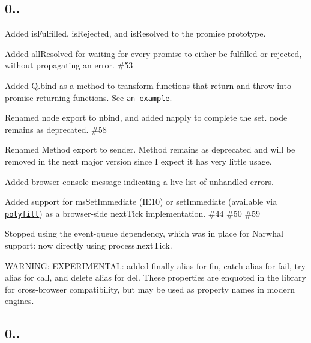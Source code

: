 \subsection*{0..}


\begin{DoxyItemize}
\item Added {\ttfamily is\+Fulfilled}, {\ttfamily is\+Rejected}, and {\ttfamily is\+Resolved} to the promise prototype.
\item Added {\ttfamily all\+Resolved} for waiting for every promise to either be fulfilled or rejected, without propagating an error.  \#53
\item Added {\ttfamily Q.\+bind} as a method to transform functions that return and throw into promise-\/returning functions. See \href{https://gist.github.com/1782808}{\tt an example}. 
\item Renamed {\ttfamily node} export to {\ttfamily nbind}, and added {\ttfamily napply} to complete the set. {\ttfamily node} remains as deprecated.  \#58
\item Renamed {\ttfamily Method} export to {\ttfamily sender}. {\ttfamily Method} remains as deprecated and will be removed in the next major version since I expect it has very little usage.
\item Added browser console message indicating a live list of unhandled errors.
\item Added support for {\ttfamily ms\+Set\+Immediate} (I\+E10) or {\ttfamily set\+Immediate} (available via \href{https://github.com/NobleJS/setImmediate}{\tt polyfill}) as a browser-\/side {\ttfamily next\+Tick} implementation. \#44 \#50 \#59
\item Stopped using the event-\/queue dependency, which was in place for Narwhal support\+: now directly using {\ttfamily process.\+next\+Tick}.
\item W\+A\+R\+N\+I\+NG\+: E\+X\+P\+E\+R\+I\+M\+E\+N\+T\+AL\+: added {\ttfamily finally} alias for {\ttfamily fin}, {\ttfamily catch} alias for {\ttfamily fail}, {\ttfamily try} alias for {\ttfamily call}, and {\ttfamily delete} alias for {\ttfamily del}. These properties are enquoted in the library for cross-\/browser compatibility, but may be used as property names in modern engines.
\end{DoxyItemize}

\subsection*{0..}


